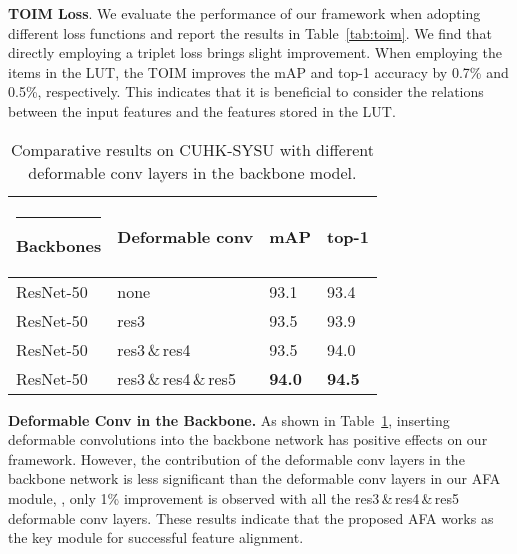 \documentclass[final]{cvpr}
\makeatletter
\newcommand{\thickhline}{\noalign {\ifnum 0=`}\fi \hrule height 1pt
    \futurelet \reserved@a \@xhline
}
\makeatother
\begin{document}
\textbf{TOIM Loss}.
We evaluate the performance of our framework when adopting different loss functions and report the results in Table~\ref{tab:toim}. We find that directly employing a triplet loss brings slight improvement. When employing the items in the LUT, the TOIM improves the mAP and top-1 accuracy by 0.7\% and 0.5\%, respectively. This indicates that it is beneficial to consider the relations between the input features and the features stored in the LUT.


\begin{table}[t]
\setlength{\abovecaptionskip}{1mm}
\centering
\begin{tabular}{p{1.7cm}|p{2.7cm}|p{1.1cm}<{\centering}p{1.1cm}<{\centering}}
\hline\thickhline
\rowcolor{mygray} 
{Backbones}  & Deformable conv   &  mAP  &  top-1  \\  \hline \hline     
ResNet-50
   & none       & 93.1   & 93.4  \\
ResNet-50
   & res3      & 93.5   & 93.9  \\
ResNet-50
   & res3{\,}\&{\,}res4      & 93.5   & 94.0  \\
ResNet-50
   & res3{\,}\&{\,}res4{\,}\&{\,}res5     &\textbf{94.0} & \textbf{94.5} \\
\hline
\end{tabular}
\caption{Comparative results on CUHK-SYSU with different deformable conv layers in the backbone model. }
\label{tab:dcn}
\end{table}

\textbf{Deformable Conv in the Backbone.}
As shown in Table~\ref{tab:dcn}, inserting deformable convolutions into the backbone network has positive effects on our framework. However, the contribution of the deformable conv layers in the backbone network is less significant than the deformable conv layers in our AFA module, \eg, only 1\% improvement is observed with all the res3{\,}\&{\,}res4{\,}\&{\,}res5 deformable conv layers. These results indicate that the proposed AFA works as the key module for successful feature alignment.
\end{document}
